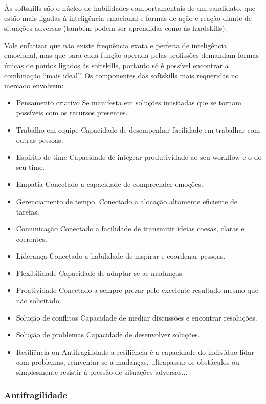 \documentclass[12pt]{article}
\begin{document}
Às softskills são o núcleo de habilidades comportamentais de um candidato, que estão mais ligadas à inteligência emocional e formas de ação e reação diante de situações adversas (também podem ser aprendidas como às hardskills).

Vale enfatizar que não existe frequência exata e perfeita de inteligência emocional, mas que para cada função operada pelas profissões demandam formas únicas de pontos ligados às softskills, portanto só é possível encontrar a combinação “mais ideal”. Os componentes das softskills mais requeridas no mercado envolvem:

\begin{itemize}

\item Pensamento criativo
 \subitem Se manifesta em soluções inusitadas que se tornam possíveis com os recursos presentes.
\item Trabalho em equipe
	\subitem Capacidade de desempenhar facilidade em trabalhar com outras pessoas.
\item Espírito de time
	\subitem Capacidade de integrar produtividade ao seu workflow e o do seu time.
\item Empatia
	\subitem Conectado a capacidade de compreender emoções.
\item Gerenciamento de tempo.
	\subitem Conectado a alocação altamente eficiente de tarefas.
\item Comunicação
	\subitem Conectado a facilidade de transmitir ideias coesas, claras e coerentes.
\item Liderança
	\subitem Conectado a habilidade de inspirar e coordenar pessoas.
\item Flexibilidade
	\subitem Capacidade de adaptar-se as mudanças.
\item Proatividade
	\subitem Conectado a sempre prezar pelo excelente resultado mesmo que não solicitado.
\item Solução de conflitos
	\subitem Capacidade de mediar discussões e encontrar resoluções.
\item Solução de problemas
	\subitem Capacidade de desenvolver soluções.
\item Resiliência ou Antifragilidade
	\subitem a resiliência é a capacidade do indivíduo lidar com problemas, reinventar-se a mudanças, ultrapassar os obstáculos ou simplesmente resistir à pressão de situações adversas...

\end{itemize}

\subsubsection{Antifragilidade}
\end{document}
